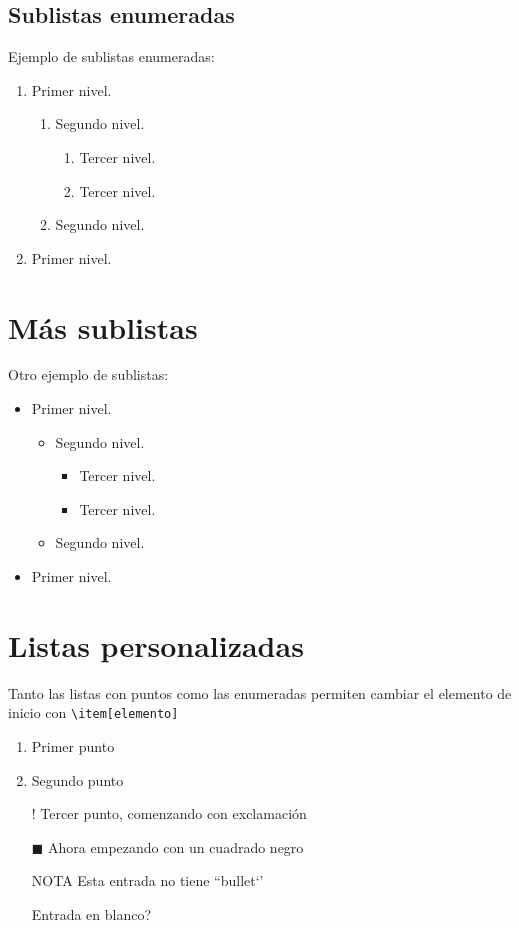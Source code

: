 
\subsection{Sublistas enumeradas}

Ejemplo de sublistas enumeradas:
\begin{enumerate}
  \item Primer nivel.
  \begin{enumerate}
    \item Segundo nivel.
    \begin{enumerate}
      \item Tercer nivel.
      \item Tercer nivel.
    \end{enumerate}
    \item Segundo nivel.
  \end{enumerate}
  \item Primer nivel.
\end{enumerate}


\section{Más sublistas}

Otro ejemplo de sublistas:
\begin{itemize}
  \item Primer nivel.
  \begin{itemize}
    \item Segundo nivel.
    \begin{itemize}
      \item Tercer nivel.
      \item Tercer nivel.
    \end{itemize}
    \item Segundo nivel.
  \end{itemize}
  \item Primer nivel.
\end{itemize}


\section{Listas personalizadas}

Tanto las listas con puntos como las enumeradas permiten cambiar el elemento de inicio con \verb|\item[elemento]|
\begin{enumerate}
  \item Primer punto
  \item Segundo punto
  \item[!] Tercer punto, comenzando con exclamación
  \item[$\blacksquare$] Ahora empezando con un cuadrado negro
  \item[NOTA] Esta entrada no tiene ``bullet‘’
  \item[] Entrada en blanco?
\end{enumerate}



